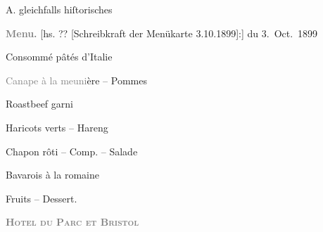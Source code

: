            \pstart \spacefill\mbox{A.}\pend{}\vspace{1em}
\pstart
           \noindent{}{\pb}gleichfalls hiſtorisches\pend
           
\pstart
           \centering{}\textcolor{gray}{\textbf{Menu.}}{ }{[}hs. ?? [Schreibkraft der Menükarte 3.10.1899]:{]} du 3. Oct. 1899\pend
           
\pstart
           \centering{}Consommé pâtés d’Italie\pend
           
\pstart
           \centering{}\textcolor{gray}{Canape à la meuni}ère – Pommes\pend
           
\pstart
           \centering{}Roastbeef garni\pend
           
\pstart
           \centering{}Haricots verts – Hareng\pend
           
\pstart
           \centering{}Chapon rôti – Comp. – Salade\pend
           
\pstart
           \centering{}Bavarois à la romaine\pend
           
\pstart
           \centering{}Fruits – Dessert.\pend
           
\pstart
           \textcolor{gray}{\textbf{\textsc{Hotel du Parc et Bristol}}}\pend
           \endnumbering{}  \newcommand{\dateiname}{L00987}\newcommand{\titel}{Arthur Schnitzler an Richard Beer-Hofmann, 3. 10. 1899}\newcommand{\editorInnen}{Martin Anton Müller und Gerd-Hermann Susen}
